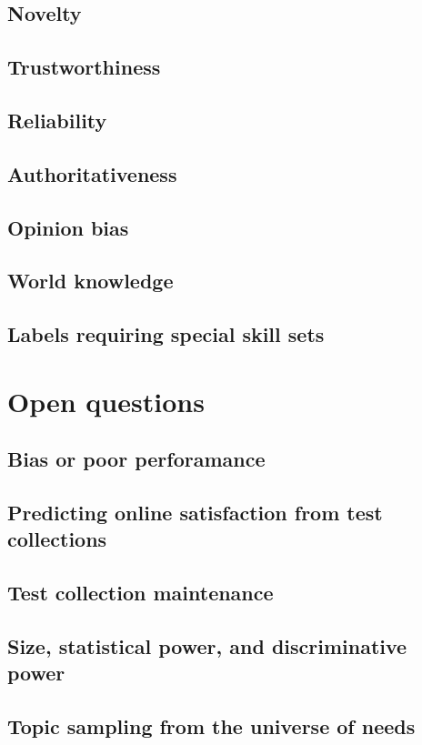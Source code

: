 \documentclass[nobib]{tufte-book}
\begin{document}
\section{Novelty}
\section{Trustworthiness}
\section{Reliability}
\section{Authoritativeness}
\section{Opinion bias}
\section{World knowledge}
\section{Labels requiring special skill sets}

\chapter{Open questions}

\section{Bias or poor perforamance}
\section{Predicting online satisfaction from test collections}
\section{Test collection maintenance}
\section{Size, statistical power, and discriminative power}
\section{Topic sampling from the universe of needs}
\end{document}
